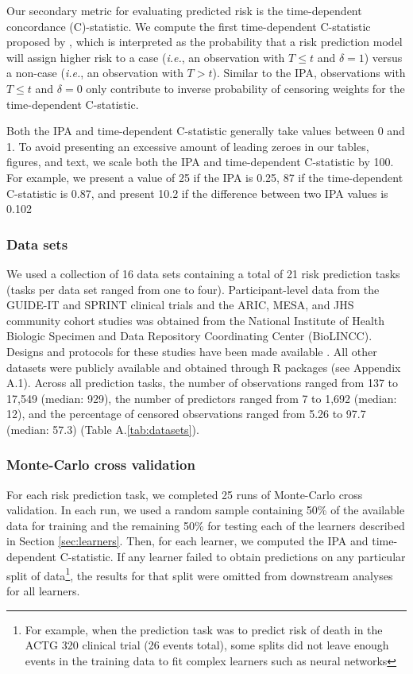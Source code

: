 \documentclass[12pt]{article}\usepackage[]{graphicx}\usepackage[]{xcolor}
\newcommand{\ie}{\textit{i.e.}}
\newcommand{\secref}[1]{Section \ref{#1}}
\newcommand{\tabrefAppendix}[1]{Table A.\ref{#1}}
\begin{document}
Our secondary metric for evaluating predicted risk is the time-dependent concordance (C)-statistic. We compute the first time-dependent C-statistic proposed by \citet[][Equation~3]{blanche2013estimating}, which is interpreted as the probability that a risk prediction model will assign higher risk to a case (\ie, an observation with $T \leq t$ and $\delta = 1$) versus a non-case (\ie, an observation with $T > t$). Similar to the IPA, observations with $T \leq t$ and $\delta = 0$ only contribute to inverse probability of censoring weights for the time-dependent C-statistic.

Both the IPA and time-dependent C-statistic generally take values between 0 and 1. To avoid presenting an excessive amount of leading zeroes in our tables, figures, and text, we scale both the IPA and time-dependent C-statistic by 100. For example, we present a value of 25 if the IPA is 0.25, 87 if the time-dependent C-statistic is 0.87, and present 10.2 if the difference between two IPA values is 0.102

\subsubsection{Data sets}

We used a collection of 16 data sets containing a total of 21 risk prediction tasks (tasks per data set ranged from one to four). Participant-level data from the GUIDE-IT and SPRINT clinical trials and the ARIC, MESA, and JHS community cohort studies was obtained from the National Institute of Health Biologic Specimen and Data Repository Coordinating Center (BioLINCC). Designs and protocols for these studies have been made available \citep{aric1989atherosclerosis, bild2002multi, felker2017effect, sprint2015randomized, taylor2005toward}. All other datasets were publicly available and obtained through R packages (see Appendix A.1). Across all prediction tasks, the number of observations ranged from 137 to 17,549 (median: 929), the number of predictors ranged from 7 to 1,692 (median: 12), and the percentage of censored observations ranged from 5.26 to 97.7 (median: 57.3) (\tabrefAppendix{tab:datasets}).

\subsubsection{Monte-Carlo cross validation}

For each risk prediction task, we completed 25 runs of Monte-Carlo cross validation. In each run, we used a random sample containing 50\% of the available data for training and the remaining 50\% for testing each of the learners described in \secref{sec:learners}. Then, for each learner, we computed the IPA and time-dependent C-statistic. If any learner failed to obtain predictions on any particular split of data\footnote{For example, when the prediction task was to predict risk of death in the ACTG 320 clinical trial (26 events total), some splits did not leave enough events in the training data to fit complex learners such as neural networks}, the results for that split were omitted from downstream analyses for all learners.
\end{document}
